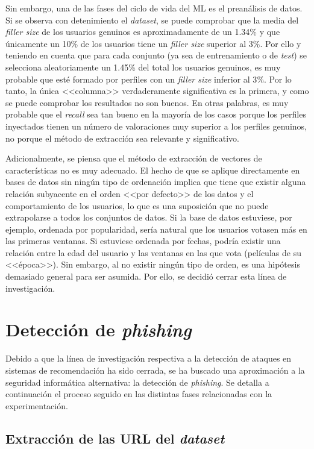 Sin embargo, una de las fases del ciclo de vida del ML es el preanálisis de datos. Si se observa con detenimiento el \textit{dataset}, se puede comprobar que la media del \textit{filler size} de los usuarios genuinos es aproximadamente de un 1.34$\%$ y que únicamente un 10$\%$ de los usuarios tiene un \textit{filler size} superior al 3$\%$. Por ello y teniendo en cuenta que para cada conjunto (ya sea de entrenamiento o de \textit{test}) se selecciona aleatoriamente un 1.45\% del total los usuarios genuinos, es muy probable que esté formado por perfiles con un \textit{filler size} inferior al 3$\%$. Por lo tanto, la única <<columna>> verdaderamente significativa es la primera, y como se puede comprobar los resultados no son buenos. En otras palabras, es muy probable que el \textit{recall} sea tan bueno en la mayoría de los casos porque los perfiles inyectados tienen un número de valoraciones muy superior a los perfiles genuinos, no porque el método de extracción sea relevante y significativo.

Adicionalmente, se piensa que el método de extracción de vectores de características no es muy adecuado. El hecho de que se aplique directamente en bases de datos sin ningún tipo de ordenación implica que tiene que existir alguna relación subyacente en el orden <<por defecto>> de los datos y el comportamiento de los usuarios, lo que es una suposición que no puede extrapolarse a todos los conjuntos de datos. Si la base de datos estuviese, por ejemplo, ordenada por popularidad, sería natural que los usuarios votasen más en las primeras ventanas. Si estuviese ordenada por fechas, podría existir una relación entre la edad del usuario y las ventanas en las que vota (películas de su <<época>>). Sin embargo, al no existir ningún tipo de orden, es una hipótesis demasiado general para ser asumida. Por ello, se decidió cerrar esta línea de investigación.


\section{Detección de \textit{phishing}}
\label{sec:5_phishing}

Debido a que la línea de investigación respectiva a la detección de ataques en sistemas de recomendación ha sido cerrada, se ha buscado una aproximación a la seguridad informática alternativa: la detección de \textit{phishing}. Se detalla a continuación el proceso seguido en las distintas fases relacionadas con la experimentación.

\subsection{Extracción de las URL del \textit{dataset}}
\label{ss:extracción-dataset-phishing}

